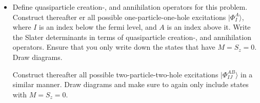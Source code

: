 \documentclass[a4paper]{article}
\begin{document}
\begin{exframe}
\begin{itemize}
  \item[\phantom{2a)}] Define quasiparticle creation-, and annihilation operators for this problem. Construct thereafter er all possible one-particle-one-hole excitations $|\Phi^A_I\rangle$, where $I$ is an index below the fermi level, and $A$ is an index above it. Write the Slater determinants in terms of quasiparticle creation-, and annihilation operators. Ensure that you only write down the states that have $M=S_z=0$. Draw diagrams.

  Construct thereafter all possible two-particle-two-hole excitations $|\Phi_{IJ}^{AB}\rangle$ in a similar manner. Draw diagrams and make sure to again only include states with $M=S_z=0$. 
\end{itemize}
\end{exframe}
\end{document}
